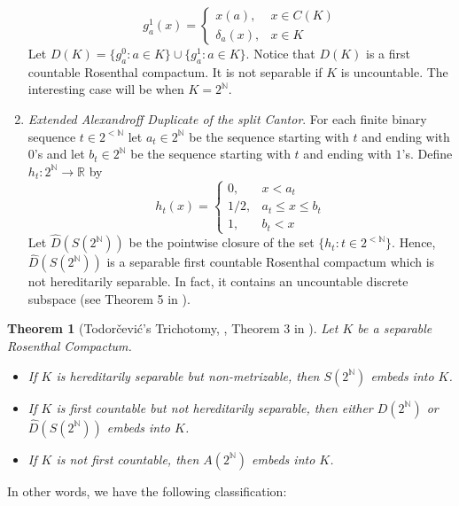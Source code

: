 \documentclass[psamsfonts]{amsart}
\newtheorem{thm}{Theorem}[section]
\theoremstyle{definition}
\theoremstyle{remark}
\numberwithin{equation}{section}
\begin{document}
\begin{enumerate}
    $$g_a^1(x)=\left\{\begin{array}{cc}
        x(a), & x\in C(K) \\
        \delta_a(x), & x\in K
    \end{array}\right.$$
    Let $D(K)=\{g_a^0:a\in K\}\cup\{g_a^1:a\in K\}$. Notice that $D(K)$ is a first countable Rosenthal compactum. It is not separable if $K$ is uncountable. The interesting case will be when $K=2^\mathbb{N}$.
    \item \emph{Extended Alexandroff Duplicate of the split Cantor}. For each finite binary sequence $t\in 2^{<\mathbb{N}}$ let $a_t\in 2^\mathbb{N}$ be the sequence starting with $t$ and ending with $0$'s and let $b_t\in 2^\mathbb{N}$ be the sequence starting with $t$ and ending with $1$'s. Define $h_t:2^\mathbb{N}\rightarrow\mathbb{R}$ by
    $$h_t(x)=\left\{\begin{array}{cc}
        0, & x<a_t \\
        1/2, & a_t\leq x \leq b_t \\
        1, & b_t<x
    \end{array}\right.$$
    Let $\hat{D}(S(2^\mathbb{N}))$ be the pointwise closure of the set $\{h_t:t\in 2^{<\mathbb{N}}\}$. Hence, $\hat{D}(S(2^\mathbb{N}))$ is a separable first countable Rosenthal compactum which is not hereditarily separable. In fact, it contains an uncountable discrete subspace (see Theorem 5 in \cite{Todorcevic_1999_CompactSubsetsBaire}).
\end{enumerate}

\begin{thm}[Todorčević's Trichotomy, \cite{Todorcevic_1999_CompactSubsetsBaire}, Theorem 3 in \cite{argyros2008rosenthal}]
    Let $K$ be a separable Rosenthal Compactum.
    \begin{itemize}
        \item [(i)] If $K$ is hereditarily separable but non-metrizable, then $S(2^\mathbb{N})$ embeds into $K$.
        \item [(ii)] If $K$ is first countable but not hereditarily separable, then either $D(2^\mathbb{N})$ or $\hat{D}(S(2^\mathbb{N}))$ embeds into $K$.
        \item [(iii)] If $K$ is not first countable, then $A(2^\mathbb{N})$ embeds into $K$.
    \end{itemize}
\end{thm}

In other words, we have the following classification:
\end{document}
